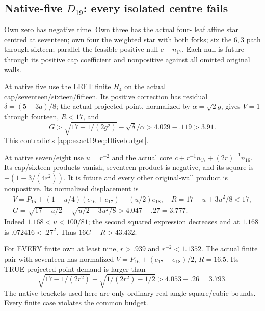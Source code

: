 \documentclass[11pt]{article}
\theoremstyle{definition}
\theoremstyle{remark}
\begin{document}
\subsection{Native-five \(D_{19}\): every isolated centre fails}
\label{app:exact19:Dfiveisolatedcentre}

Own zero has negative time.
Own three has the actual four-
leaf affine star centred at
seventeen; own four the weighted
star with both forks; six the
\(6,3\) path through sixteen;
parallel the feasible positive
null \(c+n_{17}\).
Each null is future through its
positive cap coefficient and
nonpositive against all omitted
original walls.

At native five use the LEFT
finite \(H_4\) on the actual
cap/seventeen/sixteen/fifteen.
Its positive correction has
residual \(\delta=(5-3a)/8\);
the actual projected point,
normalized by \(\alpha=\sqrt2g\),
gives \(V=1\) through fourteen,
\(R<17\), and
\[
 G>\sqrt{17-1/(2g^2)}-\sqrt\delta/\alpha
                                      >4.029-.119>3.91 .
\]
This contradicts
\eqref{app:exact19:eq:Dfivebudget}.

At native seven/eight use
\(u=r^{-2}\) and the actual core
\(c+r^{-1}n_{17}+(2r)^{-1}n_{16}\).
Its cap/sixteen products vanish,
seventeen product is negative,
and its square is
\(-(1-3/(4r^2))\).
It is future and every other
original-wall product is
nonpositive.
Its normalized displacement is
\[
 \begin{gathered}
 V=P_{15}+(1-u/4)(e_{16}+e_{17})+(u/2)e_{18},
                 \quad R=17-u+3u^2/8<17,\\
 G=\sqrt{17-u/2}-\sqrt{u/2-3u^2/8}>4.047-.27=3.777 .
 \end{gathered}
\]
Indeed \(1.168<u<100/81\);
the second squared expression
decreases and at \(1.168\) is
\(.072416<.27^2\).
Thus \(16G-R>43.432\).

For EVERY finite own at least
nine, \(r>.939\) and
\(r^{-2}<1.1352\).
The actual finite pair with
seventeen has normalized
\(V=P_{16}+(e_{17}+e_{18})/2\),
\(R=16.5\).
Its TRUE projected-point demand
is larger than
\[
 \sqrt{17-1/(2r^2)}-\sqrt{1/(2r^2)-1/2}
                                      >4.053-.26=3.793 .
\]
The native brackets used here
are only ordinary real-angle
square/cubic bounds.
Every finite case violates the
common budget.
\end{document}
